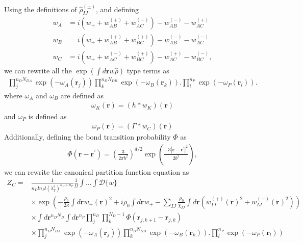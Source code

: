 \documentclass{article}
\begin{document}
Using the definitions of $\hat{\rho}_{IJ}^{(\pm)}$, and defining
\begin{align*}
  w_A &=
    i \left( w_+ + w_{AB}^{(+)} + w_{AC}^{(-)} \right)
    - w_{AB}^{(-)} - w_{AC}^{(+)} \\
  w_B &=
    i \left( w_+ + w_{AB}^{(+)} + w_{BC}^{(+)} \right)
    - w_{AB}^{(-)} - w_{AC}^{(-)} \\
  w_C &=
    i \left( w_+ + w_{AC}^{(-)} + w_{BC}^{(+)} \right)
    - w_{AC}^{(+)} - w_{BC}^{(-)},
\end{align*}
  we can rewrite all the $\exp(\int d \mathbf{r} w\hat{\rho})$ type terms as
\begin{align*}
  \prod_{j}^{n_{D}N_{DA}}
  \exp \left( -\omega_A(\mathbf{r}_j) \right)
  \prod_{k}^{n_{D}N_{DB}}
  \exp \left( -\omega_B(\mathbf{r}_k) \right).
  \prod_{l}^{n_P}
  \exp \left( -\omega_P(\mathbf{r}_l) \right).
\end{align*}
where $\omega_A$ and $\omega_B$ are defined as
\begin{align*}
  \omega_K(\mathbf{r}) = (h \ast w_K)(\mathbf{r})
\end{align*}
and $\omega_P$ is defined as
\begin{align*}
  \omega_P(\mathbf{r}) = (\Gamma \ast w_C)(\mathbf{r})
\end{align*}
Additionally, defining the bond transition probability $\Phi$ as
\begin{align*}
  \Phi(\mathbf{r} - \mathbf{r}^\prime) =
    \left( \frac{3}{2\pi b^2} \right) ^ {d/2}
    \exp \left( \frac{-3| \mathbf{r} - \mathbf{r}^\prime |^2}{2b^2} \right),
\end{align*}
we can rewrite the canonical partition function equation as
\begin{align*}
  Z_C =& \frac{1}{n_D!n_P! \left( \lambda_T^3 \right)^{n_D+n_P}}
    \frac{1}{\Omega}
    \int \hdots \int \mathcal{D} \{w\} \\
    &\times
    \exp \left(
      - \frac{\rho_0}{2\kappa} \int d \mathbf{r} w_+(\mathbf{r})^2
      + i \rho_0 \int d\mathbf{r} w_+
      - \sum_{IJ}
      \frac{\rho_0}{\chi_{IJ}}
      \int d \mathbf{r}
      \left(
        w_{IJ}^{(+)} (\mathbf{r})^2 + w_{IJ}^{(-)} (\mathbf{r})^2
      \right)
    \right) \\
    &\times \int d \mathbf{r}^{n_DN_D} \int d \mathbf{r}^{n_P}
      \prod_j^{n_D} \prod_k^{N_D-1}
      \Phi(\mathbf{r}_{j,k+1} - \mathbf{r}_{j,k}) \\
    &\times
    \prod_{j}^{n_{D}N_{DA}} \exp \left( -\omega_A(\mathbf{r}_j) \right)
    \prod_{k}^{n_{D}N_{DB}} \exp \left( -\omega_B(\mathbf{r}_k) \right).
    \prod_{l}^{n_P}         \exp \left( -\omega_P(\mathbf{r}_l) \right)
\end{align*}
\end{document}
